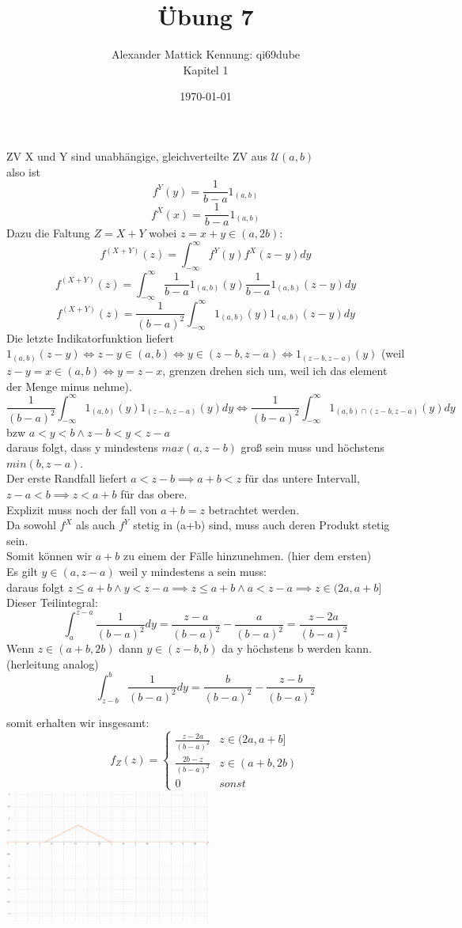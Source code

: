 \documentclass{article}
\author{
Alexander Mattick Kennung: qi69dube\\
Kapitel 1
}
\date{\today}
\title{Übung 7}
\begin{document}
	\maketitle
	ZV X und Y sind unabhängige, gleichverteilte ZV aus $\mathcal{U}(a,b)$\\
	also ist
	\[f^Y(y)=\frac{1}{b-a}1_{(a,b)}\]
	\[f^X(x)=\frac{1}{b-a}1_{(a,b)}\]
	Dazu die Faltung $Z=X+Y$ wobei $z=x+y\in (a,2b)$:
	\[f^{(X+Y)}(z)=\int^\infty_{-\infty}f^Y(y)f^X(z-y)dy\]
	\[f^{(X+Y)}(z)=\int^\infty_{-\infty}\frac{1}{b-a}1_{(a,b)}(y)\frac{1}{b-a}1_{(a,b)}(z-y)dy\]
	\[f^{(X+Y)}(z)=\frac{1}{(b-a)^2}\int^\infty_{-\infty}1_{(a,b)}(y)1_{(a,b)}(z-y)dy\]
	Die letzte Indikatorfunktion liefert $1_{(a,b)}(z-y)\iff z-y\in(a,b) \iff y\in (z-b,z-a)\iff 1_{(z-b,z-a)}(y)$ (weil $z-y=x\in(a,b)\iff y = z-x$, grenzen drehen sich um, weil ich das element der Menge minus nehme).\\
	\[\frac{1}{(b-a)^2}\int^\infty_{-\infty}1_{(a,b)}(y)1_{(z-b,z-a)}(y)dy\iff \frac{1}{(b-a)^2}\int^\infty_{-\infty}1_{(a,b)\cap (z-b,z-a)}(y)dy\]
	bzw $a<y<b \land z-b < y <z-a$\\
	daraus folgt, dass y mindestens $max(a,z-b)$ groß sein muss und höchstens $min(b,z-a)$.\\
	Der erste Randfall liefert $a<z-b\implies a+b<z$ für das untere Intervall, $z-a<b\implies z<a+b $
	für das obere.\\
	Explizit muss noch der fall von $a+b=z $ betrachtet werden.\\
	Da sowohl $f^X$ als auch $f^Y$ stetig in (a+b) sind, muss auch deren Produkt stetig sein.\\
	Somit können wir $a+b$ zu einem der Fälle hinzunehmen. (hier dem ersten)\\
	Es gilt $y\in (a,z-a)$ weil y mindestens a sein muss:\\
	daraus folgt $z\leq a+b \land y<z-a\implies z\leq a+b \land a<z-a\implies  z\in (2a,a+b]$\\
	Dieser Teilintegral:\\
	\[\int_a^{z-a}\frac{1}{(b-a)^2}dy = \frac{z-a}{(b-a)^2}-\frac{a}{(b-a)^2}=\frac{z-2a}{(b-a)^2}\]
	Wenn $z\in (a+b,2b)$ dann $ y\in (z-b,b)$ da y höchstens b werden kann.\\
	(herleitung analog)
	\[\int^b_{z-b}\frac{1}{(b-a)^2}dy = \frac{b}{(b-a)^2}-\frac{z-b}{(b-a)^2}\]

	somit erhalten wir insgesamt:
	\begin{equation*}
	f_Z(z) = \begin{cases}
	\frac{z-2a}{(b-a)^2}&z\in (2a,a+b]\\
	\frac{2b-z}{(b-a)^2}&z\in (a+b,2b)\\
	0 &sonst
	\end{cases}
	\end{equation*}
	\includegraphics[width=256px]{skizzeHauptaufgabe.png}
\end{document}
